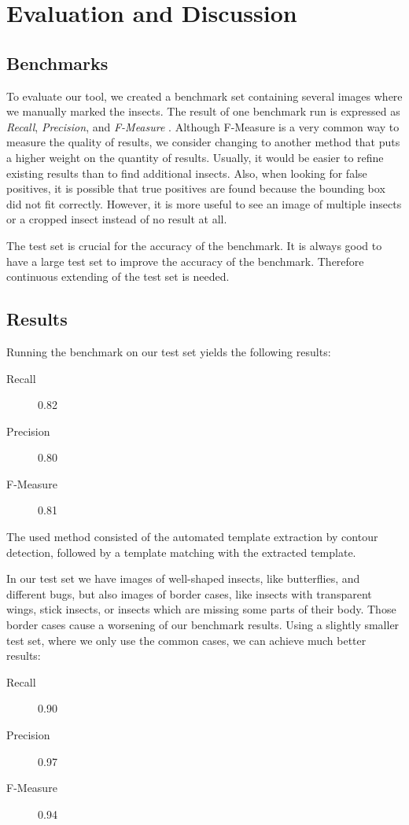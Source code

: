 %
\section{Evaluation and Discussion}
\label{sec_eval}
\label{sec_conclusion}

\subsection{Benchmarks}
To evaluate our tool, we created a benchmark set containing several images where we manually marked the insects.
The result of one benchmark run is expressed as \textit{Recall}, \textit{Precision}, and \textit{F-Measure} \cite{f_measure}.
Although F-Measure is a very common way to measure the quality of results, we consider changing  to another method that puts a higher weight on the quantity of results. 
Usually, it would be easier to refine existing results than to find additional insects. 
Also, when looking for false positives, it is possible that true positives are found because the bounding box did not fit correctly.
However, it is more useful to see an image of multiple insects or a cropped insect instead of no result at all.

The test set is crucial for the accuracy of the benchmark. 
It is always good to have a large test set to improve the accuracy of the benchmark.
Therefore continuous extending of the test set is needed. 

\subsection{Results}

Running the benchmark on our test set yields the following results:
%
\begin{description}
	\item[Recall] 0.82
	\item[Precision] 0.80
	\item[F-Measure] 0.81
\end{description}
%
The used method consisted of the automated template extraction by contour detection, followed by a template matching with the extracted template.

In our test set we have images of well-shaped insects, like butterflies, and different bugs,
but also images of border cases, like insects with transparent wings, stick insects, or insects which are missing some parts of their body.
Those border cases cause a worsening of our benchmark results.
Using a slightly smaller test set, where we only use the common cases, we can achieve much better results:
%
\begin{description}
	\item[Recall] 0.90
	\item[Precision] 0.97
	\item[F-Measure] 0.94
\end{description}
%

